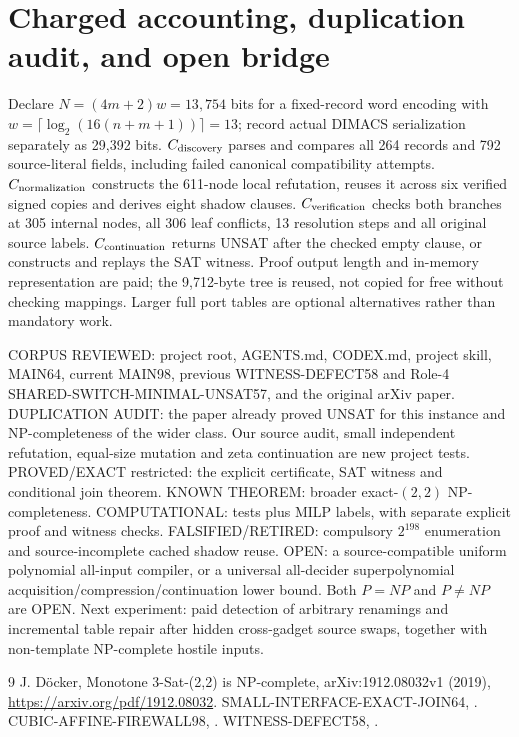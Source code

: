 \documentclass[10pt]{article}
\begin{document}
\section{Charged accounting, duplication audit, and open bridge}
Declare $N=(4m+2)w=13,754$ bits for a fixed-record word encoding with $w=\lceil\log_2(16(n+m+1))\rceil=13$; record actual DIMACS serialization separately as 29,392 bits. $C_{\rm discovery}$ parses and compares all 264 records and 792 source-literal fields, including failed canonical compatibility attempts. $C_{\rm normalization}$ constructs the 611-node local refutation, reuses it across six verified signed copies and derives eight shadow clauses. $C_{\rm verification}$ checks both branches at 305 internal nodes, all 306 leaf conflicts, 13 resolution steps and all original source labels. $C_{\rm continuation}$ returns UNSAT after the checked empty clause, or constructs and replays the SAT witness. Proof output length and in-memory representation are paid; the 9,712-byte tree is reused, not copied for free without checking mappings. Larger full port tables are optional alternatives rather than mandatory work.

CORPUS REVIEWED: project root, AGENTS.md, CODEX.md, project skill, MAIN64, current MAIN98, previous WITNESS-DEFECT58 and Role-4 SHARED-SWITCH-MINIMAL-UNSAT57, and the original arXiv paper. DUPLICATION AUDIT: the paper already proved UNSAT for this instance and NP-completeness of the wider class. Our source audit, small independent refutation, equal-size mutation and zeta continuation are new project tests. PROVED/EXACT restricted: the explicit certificate, SAT witness and conditional join theorem. KNOWN THEOREM: broader exact-$(2,2)$ NP-completeness. COMPUTATIONAL: tests plus MILP labels, with separate explicit proof and witness checks. FALSIFIED/RETIRED: compulsory $2^{198}$ enumeration and source-incomplete cached shadow reuse. OPEN: a source-compatible uniform polynomial all-input compiler, or a universal all-decider superpolynomial acquisition/compression/continuation lower bound. Both $P=NP$ and $P\ne NP$ are OPEN. Next experiment: paid detection of arbitrary renamings and incremental table repair after hidden cross-gadget source swaps, together with non-template NP-complete hostile inputs.

\begin{thebibliography}{9}
 J. D\"ocker, Monotone 3-Sat-(2,2) is NP-complete, arXiv:1912.08032v1 (2019), \url{https://arxiv.org/pdf/1912.08032}.
 SMALL-INTERFACE-EXACT-JOIN64, .
 CUBIC-AFFINE-FIREWALL98, .
 WITNESS-DEFECT58, .
\end{thebibliography}
\end{document}
